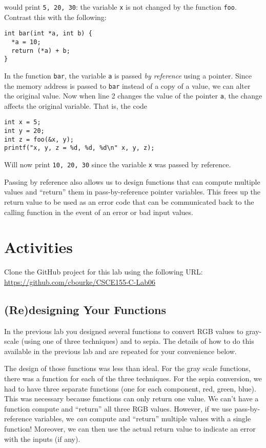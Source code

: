 \documentclass[12pt]{scrartcl}
\begin{document}
would print \texttt{5, 20, 30}: the variable \texttt{x} is not
changed by the function \texttt{foo}.  Contrast this with the following:

\begin{verbatim}
int bar(int *a, int b) {
  *a = 10;
  return (*a) + b;
}
\end{verbatim}

In the function \texttt{bar}, the variable \texttt{a} is passed
\emph{by reference} using a pointer.  Since the memory address is passed
to \texttt{bar} instead of a copy of a value, we can alter the original
value.  Now when line 2 changes the value of the pointer \texttt{a}, 
the change affects the original variable.  That is, the code 

\begin{verbatim}
int x = 5;
int y = 20;
int z = foo(&x, y);
printf("x, y, z = %d, %d, %d\n" x, y, z);
\end{verbatim}

Will now print \texttt{10, 20, 30} since the variable \texttt{x}
was passed by reference.

Passing by reference also allows us to design functions that can
compute multiple values and ``return'' them in pass-by-reference
pointer variables.  This frees up the return value to be used as 
an error code that can be communicated back to the calling function
in the event of an error or bad input values.

\section{Activities}

Clone the GitHub project for this lab using the following URL:
\url{https://github.com/cbourke/CSCE155-C-Lab06}

\subsection{(Re)designing Your Functions}

In the previous lab you designed several functions to convert RGB
values to gray-scale (using one of three techniques) and to sepia.
The details of how to do this available in the previous lab and 
are repeated for your convenience below.  

The design of those functions was less than ideal.  For the
gray scale functions, there was a function for each of the three 
techniques.  For the sepia conversion, we had to have three separate
functions (one for each component, red, green, blue).  This was 
necessary because functions can only return one value.  We can't have
a function compute and ``return'' all three RGB values.  However,
if we use pass-by-reference variables, we \emph{can} compute and
``return'' multiple values with a single function!  Moreover, we
can then use the actual return value to indicate an error with the inputs
(if any).  
\end{document}
